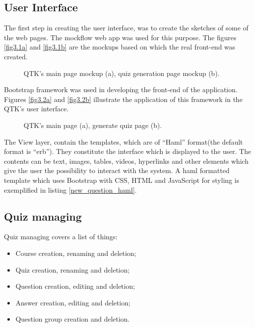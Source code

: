 \subsection{User Interface}
The first step in creating the user interface, was to create the sketches of some of the web pages. The mockflow web app was used for this purpose. The figures \ref{fig3.1a} and \ref{fig3.1b} are the mockups based on which the real front-end was created.

\begin{figure}[!ht]
  \centering
 \hspace{0.09cm}
  \caption{QTK's main page mockup (a), quiz generation page mockup (b).}
  \label{fig1.1}
\end{figure}


Bootstrap framework was used in developing the front-end of the application. Figures \ref{fig3.2a} and \ref{fig3.2b} illustrate the application of this framework in the QTK's user interface.


\begin{figure}[!ht]
  \centering
 \hspace{0.09cm}
  \caption{QTK's main page (a), generate quiz page (b).}
  \label{fig1.1}
\end{figure}


The View layer, contain the templates, which are of ``Haml'' format(the default format is ``erb''). They constitute the interface which is displayed to the user. The contents can be text, images, tables, videos, hyperlinks and other elements which give the user the possibility to interact with the system. A haml formatted template which uses Bootstrap with CSS, HTML and JavaScript for styling is exemplified in listing \ref{new_question_haml}.



\subsection{Quiz managing}
Quiz managing covers a list of things:
\begin{itemize}
  \item Course creation, renaming and deletion;
  \item Quiz creation, renaming and deletion;
  \item Question creation, editing and deletion;
  \item Answer creation, editing and deletion;
  \item Question group creation and deletion.
\end{itemize}

